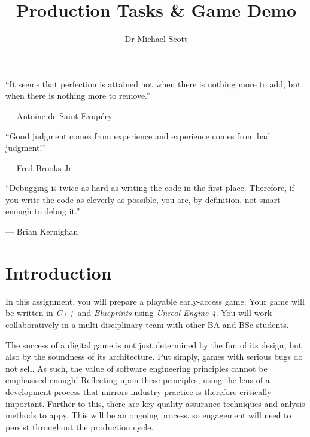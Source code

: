 \documentclass{../../fal_assignment}
\title{Production Tasks \& Game Demo}
\author{Dr Michael Scott}
\begin{document}
\maketitle

\begin{marginquote}
    ``It seems that perfection is attained not when there is nothing more to add,
        but when there is nothing more to remove.''
    
    --- Antoine de Saint-Exup\'ery
    
    \marginquoterule
    
    ``Good judgment comes from experience and experience comes from bad judgment!''
    
    --- Fred Brooks Jr
    
    \marginquoterule
    
    ``Debugging is twice as hard as writing the code in the first place.
     Therefore, if you write the code as cleverly as possible, you are, by definition, not smart enough to debug it.'' 
 
         --- Brian Kernighan
     
\end{marginquote}

\section*{Introduction}

In this assignment, you will prepare a playable early-access game. Your game will be written in \textit{C++} and \textit{Blueprints} using \textit{Unreal Engine 4}. You will work collaboratively in a multi-disciplinary team with other BA and BSc students.

The success of a digital game is not just determined by the fun of its design, but also by the soundness of its architecture. Put simply, games with serious bugs do not sell. As such, the value of software engineering principles cannot be emphasised enough! Reflecting upon these principles, using the lens of a development process that mirrors industry practice is therefore critically important. Further to this, there are key quality assurance techniques and anlysis methods to appy. This will be an ongoing process, so engagement will need to persist throughout the production cycle.
\end{document}
